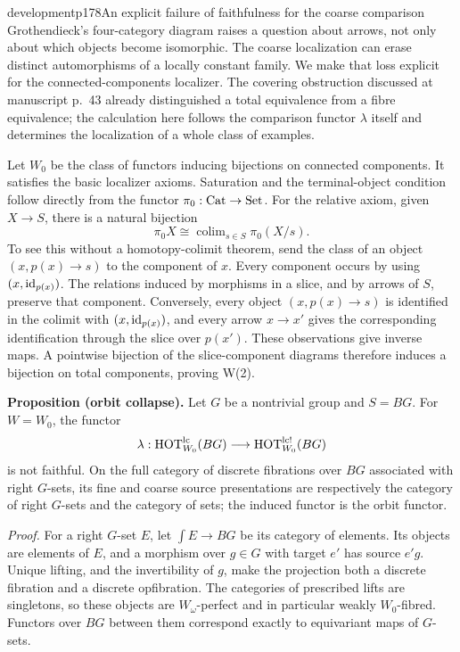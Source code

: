 \begin{dcomment}{development}{p178}{An explicit failure of faithfulness for the coarse comparison}
Grothendieck's four-category diagram raises a question about arrows, not only about which objects become isomorphic. The coarse localization can erase distinct automorphisms of a locally constant family. We make that loss explicit for the connected-components localizer. The covering obstruction discussed at manuscript p.~43 already distinguished a total equivalence from a fibre equivalence; the calculation here follows the comparison functor $\lambda$ itself and determines the localization of a whole class of examples.

Let $W_0$ be the class of functors inducing bijections on connected components. It satisfies the basic localizer axioms. Saturation and the terminal-object condition follow directly from the functor $\pi_0:\mathrm{Cat}\to\mathrm{Set}$. For the relative axiom, given $X\to S$, there is a natural bijection
\[
 \pi_0X\cong\mathop{\mathrm{colim}}_{s\in S}\pi_0(X/s).
\]
To see this without a homotopy-colimit theorem, send the class of an object $(x,p(x)\to s)$ to the component of $x$. Every component occurs by using $(x,\mathrm{id}_{p(x)})$. The relations induced by morphisms in a slice, and by arrows of $S$, preserve that component. Conversely, every object $(x,p(x)\to s)$ is identified in the colimit with $(x,\mathrm{id}_{p(x)})$, and every arrow $x\to x'$ gives the corresponding identification through the slice over $p(x')$. These observations give inverse maps. A pointwise bijection of the slice-component diagrams therefore induces a bijection on total components, proving W(2).

\textbf{Proposition (orbit collapse).}\ours\quad
Let $G$ be a nontrivial group and $S=BG$. For $W=W_0$, the functor
\[
 \lambda:\mathrm{HOT}_{W_0}^{\mathrm{lc}}(BG)
 \longrightarrow\mathrm{HOT}_{W_0}^{\mathrm{lc}!}(BG)
\]
is not faithful. On the full category of discrete fibrations over $BG$ associated with right $G$-sets, its fine and coarse source presentations are respectively the category of right $G$-sets and the category of sets; the induced functor is the orbit functor.

\emph{Proof.} For a right $G$-set $E$, let $\int E\to BG$ be its category of elements. Its objects are elements of $E$, and a morphism over $g\in G$ with target $e'$ has source $e'g$. Unique lifting, and the invertibility of $g$, make the projection both a discrete fibration and a discrete opfibration. The categories of prescribed lifts are singletons, so these objects are $W_\omega$-perfect and in particular weakly $W_0$-fibred. Functors over $BG$ between them correspond exactly to equivariant maps of $G$-sets.


\end{dcomment}
